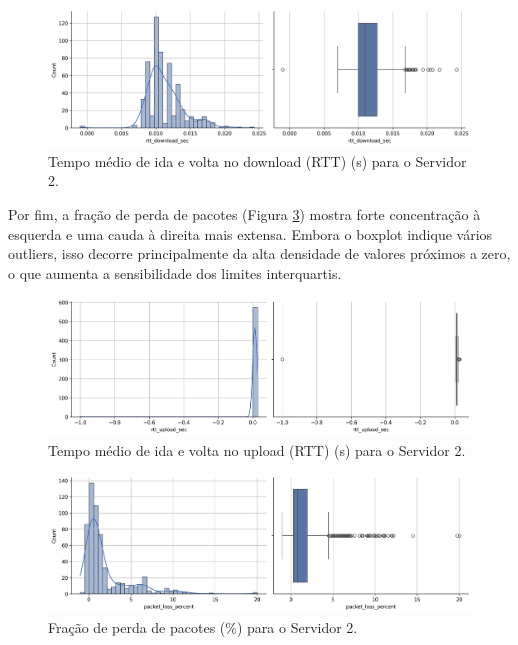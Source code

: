 \documentclass{article}
\begin{document}
\begin{figure}[H]
	\includegraphics[width=\textwidth]{../figures/eda/chart_rtt_download_sec_server02.png}
	\caption{Tempo médio de ida e volta no download (RTT) (s) para o Servidor 2.}
	\label{fig:chart_rtt_download_sec_server02}
\end{figure}

Por fim, a fração de perda de pacotes (Figura \ref{fig:chart_packet_loss_percent_server02}) mostra forte concentração à esquerda e uma cauda à direita mais extensa.  
Embora o boxplot indique vários outliers, isso decorre principalmente da alta densidade de valores próximos a zero, o que aumenta a sensibilidade dos limites interquartis.

\begin{figure}[H]
	\includegraphics[width=\textwidth]{../figures/eda/chart_rtt_upload_sec_server02.png}
	\caption{Tempo médio de ida e volta no upload (RTT) (s) para o Servidor 2.}
	\label{fig:chart_rtt_upload_sec_server02}
\end{figure}

\begin{figure}[htp]
	\includegraphics[width=\textwidth]{../figures/eda/chart_packet_loss_percent_server02.png}
	\caption{Fração de perda de pacotes (\%) para o Servidor 2.}
	\label{fig:chart_packet_loss_percent_server02}
\end{figure}
\end{document}
